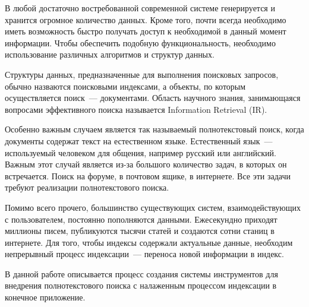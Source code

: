 
В любой достаточно востребованной современной системе генерируется и хранится огромное количество данных. Кроме того, почти всегда необходимо иметь возможность быстро получать доступ к необходимой в данный момент информации. Чтобы обеспечить подобную функциональность, необходимо использование различных алгоритмов и структур данных. 

Структуры данных, предназначенные для выполнения поисковых запросов, обычно назваются поисковыми индексами, а объекты, по которым осуществляется поиск~--- документами. Область научного знания, занимающаяся вопросами эффективного поиска называется Information Retrieval (IR).

Особенно важным случаем является так называемый полнотекстовый поиск, когда документы содержат текст на естественном языке. Естественный язык~--- используемый человеком для общения, например русский или английский. Важным этот случай является из-за большого количество задач, в которых он встречается. Поиск на форуме, в почтовом ящике, в интернете. Все эти задачи требуют реализации полнотекстового поиска.

Помимо всего прочего, большинство существующих систем, взаимодействующих с пользователем, постоянно пополняются данными. Ежесекундно приходят миллионы писем, публикуются тысячи статей и создаются сотни станиц в интернете. Для того, чтобы индексы содержали актуальные данные, необходим непрерывный процесс индексации~--- переноса новой информации в индекс.

В данной работе описывается процесс создания системы инструментов для внедрения полнотекстового поиска с налаженным процессом индексации в конечное приложение.

\clearpage
